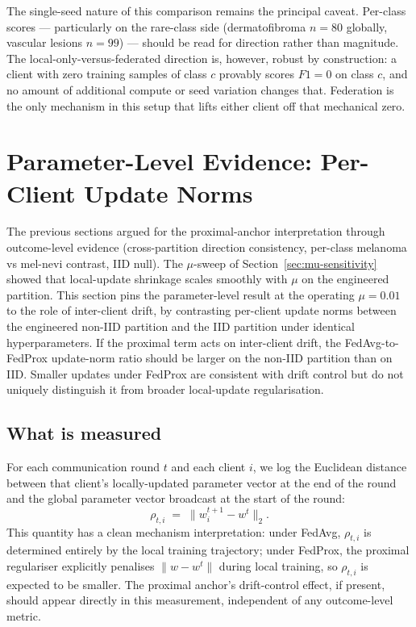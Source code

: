 \documentclass[11pt,a4paper]{report}
\begin{document}
The single-seed nature of this comparison remains the principal
caveat. Per-class scores --- particularly on the rare-class side
(dermatofibroma $n = 80$ globally, vascular lesions $n = 99$) ---
should be read for direction rather than magnitude. The
local-only-versus-federated direction is, however, robust by
construction: a client with zero training samples of class $c$
provably scores $F1 = 0$ on class $c$, and no amount of additional
compute or seed variation changes that. Federation is the
only mechanism in this setup that lifts either client off that
mechanical zero.

\section{Parameter-Level Evidence: Per-Client Update Norms}
\label{sec:update-norms}

The previous sections argued for the proximal-anchor
interpretation through outcome-level evidence (cross-partition
direction consistency, per-class melanoma vs mel-nevi contrast,
IID null). The $\mu$-sweep of Section~\ref{sec:mu-sensitivity}
showed that local-update shrinkage scales smoothly with $\mu$ on
the engineered partition. This section pins the parameter-level
result at the operating $\mu = 0.01$ to the role of inter-client
drift, by contrasting per-client update norms between the
engineered non-IID partition and the IID partition under
identical hyperparameters. If the proximal term acts on
inter-client drift, the FedAvg-to-FedProx update-norm ratio
should be larger on the non-IID partition than on IID. Smaller
updates under FedProx are consistent with drift control but do
not uniquely distinguish it from broader local-update
regularisation.

\subsection{What is measured}
\label{sec:update-norms-setup}

For each communication round $t$ and each client $i$, we log
the Euclidean distance between that client's locally-updated
parameter vector at the end of the round and the global
parameter vector broadcast at the start of the round:
\[
\rho_{t,i} \;=\; \lVert w_i^{t+1} - w^t \rVert_2.
\]
This quantity has a clean mechanism interpretation: under
FedAvg, $\rho_{t,i}$ is determined entirely by the local
training trajectory; under FedProx, the proximal regulariser
explicitly penalises $\lVert w - w^t \rVert$ during local
training, so $\rho_{t,i}$ is expected to be smaller. The
proximal anchor's drift-control effect, if present, should
appear directly in this measurement, independent of any
outcome-level metric.
\end{document}
